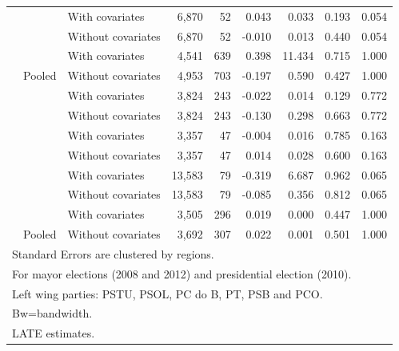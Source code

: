 \documentclass[
  12pt,
]{article}
\begin{document}
\begin{table}[H]
\begin{tabular}[t]{lllrrrrrr}
 &  & With covariates & 6,870 & 52 & 0.043 & 0.033 & 0.193 & 0.054\\


 & \multirow{-2}{*}{\raggedright\arraybackslash 60000} & Without covariates & 6,870 & 52 & -0.010 & 0.013 & 0.440 & 0.054\\


 &  & With covariates & 4,541 & 639 & 0.398 & 11.434 & 0.715 & 1.000\\


\multirow{-8}{*}{\raggedright\arraybackslash 2010} & \multirow{-2}{*}{\raggedright\arraybackslash Pooled} & Without covariates & 4,953 & 703 & -0.197 & 0.590 & 0.427 & 1.000\\

\cmidrule{1-9}
 &  & With covariates & 3,824 & 243 & -0.022 & 0.014 & 0.129 & 0.772\\


 & \multirow{-2}{*}{\raggedright\arraybackslash 20000} & Without covariates & 3,824 & 243 & -0.130 & 0.298 & 0.663 & 0.772\\


 &  & With covariates & 3,357 & 47 & -0.004 & 0.016 & 0.785 & 0.163\\


 & \multirow{-2}{*}{\raggedright\arraybackslash 40000} & Without covariates & 3,357 & 47 & 0.014 & 0.028 & 0.600 & 0.163\\


 &  & With covariates & 13,583 & 79 & -0.319 & 6.687 & 0.962 & 0.065\\


 & \multirow{-2}{*}{\raggedright\arraybackslash 60000} & Without covariates & 13,583 & 79 & -0.085 & 0.356 & 0.812 & 0.065\\


 &  & With covariates & 3,505 & 296 & 0.019 & 0.000 & 0.447 & 1.000\\


\multirow{-8}{*}{\raggedright\arraybackslash 2012} & \multirow{-2}{*}{\raggedright\arraybackslash Pooled} & Without covariates & 3,692 & 307 & 0.022 & 0.001 & 0.501 & 1.000\\
\bottomrule
\multicolumn{9}{l}{\rule{0pt}{1em}Standard Errors are clustered by regions.}\\
\multicolumn{9}{l}{\rule{0pt}{1em}For mayor elections (2008 and 2012) and presidential election (2010).}\\
\multicolumn{9}{l}{\rule{0pt}{1em}Left wing parties: PSTU, PSOL, PC do B, PT, PSB and PCO.}\\
\multicolumn{9}{l}{\rule{0pt}{1em}Bw=bandwidth.}\\
\multicolumn{9}{l}{\rule{0pt}{1em}LATE estimates.}\\
\end{tabular}
\end{table}
\end{document}
